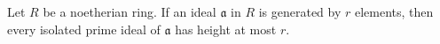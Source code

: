 Let $R$ be a noetherian ring. If an ideal $\mathfrak{a}$ in $R$ is generated by $r$ elements, then every isolated prime ideal of $\mathfrak{a}$ has height at most $r$.
